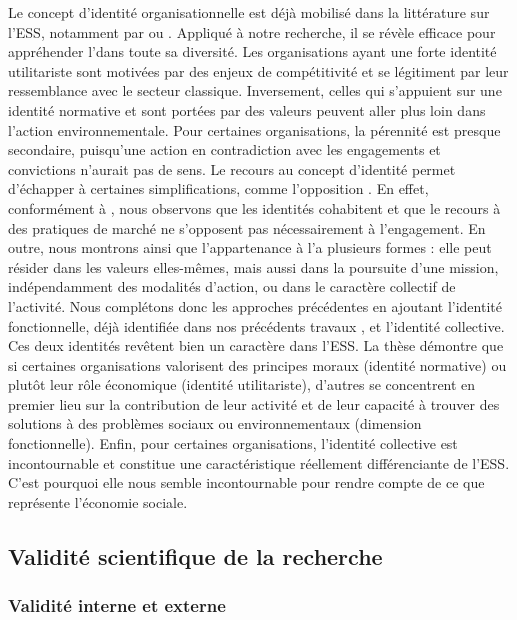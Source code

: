     Le concept d'identité organisationnelle est déjà mobilisé dans la littérature sur l'ESS, notamment par \textcite{chedotel2012linfluence} ou \textcite{young2000alternative, young2001organizational, young2001organizational-1}. Appliqué à notre recherche, il se révèle efficace pour appréhender l'\ess dans toute sa diversité. Les organisations ayant une forte identité utilitariste sont motivées par des enjeux de compétitivité et se légitiment par leur ressemblance avec le secteur classique. Inversement, celles qui s'appuient sur une identité normative et sont portées par des valeurs peuvent aller plus loin dans l'action environnementale. Pour certaines organisations, la pérennité est presque secondaire, puisqu'une action en contradiction avec les engagements et convictions n'aurait pas de sens. Le recours au concept d'identité permet d'échapper à certaines simplifications, comme l'opposition . En effet, conformément à \textcite{foreman2002members}, nous observons que les identités cohabitent et que le recours à des pratiques de marché ne s'opposent pas nécessairement à l'engagement. En outre, nous montrons ainsi que l'appartenance à l'\ess a plusieurs formes : elle peut résider dans les valeurs elles-mêmes, mais aussi dans la poursuite d'une mission, indépendamment des modalités d'action, ou dans le caractère collectif de l'activité. Nous complétons donc les approches précédentes en ajoutant l'identité fonctionnelle, déjà identifiée dans nos précédents travaux \parencite{mariaux2018leconomie}, et l'identité collective. Ces deux identités revêtent bien un caractère  dans l'ESS. La thèse démontre que si certaines organisations valorisent des principes moraux (identité normative) ou plutôt leur rôle économique (identité utilitariste), d'autres se concentrent en premier lieu sur la contribution de leur activité et de leur capacité à trouver des solutions à des problèmes sociaux ou environnementaux (dimension fonctionnelle). Enfin, pour certaines organisations, l'identité collective est incontournable et constitue une caractéristique réellement différenciante de l'ESS. C'est pourquoi elle nous semble incontournable pour rendre compte de ce que représente l'économie sociale.

 \subsection{Validité scientifique de la recherche}

        \subsubsection{Validité interne et externe}

